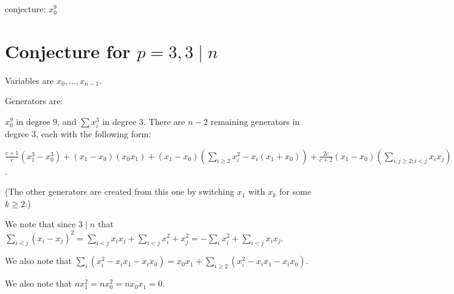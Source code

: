 \documentclass{article}
\numberwithin{equation}{section}
\begin{document}
conjecture: $x_0^9$



\section{Conjecture for $p=3, 3 \mid n$}

Variables are $x_0,\dots,x_{n-1}$. 

Generators are:

$x_0^9$ in degree $9$, and $\sum x_i^3$ in degree $3$. There are $n-2$ remaining generators in degree $3$, each with the following form:

$\frac{c+1}{c}(x_1^3-x_0^3) +(x_1-x_0)(x_0x_1)+(x_1-x_0)\left(\sum_{i \ge 2}x_i^2-x_i(x_1+x_0)\right)+\frac{2c}{c+2}(x_1-x_0)\left(\sum_{i,j \ge 2; i < j}x_ix_j\right)$.



(The other generators are created from this one by switching $x_1$ with $x_k$ for some $k \ge 2$.)


We note that since $3 \mid n$ that $\sum_{i < j} (x_i-x_j)^2 = \sum_{i < j} x_ix_j + \sum_{i<j} x_i^2+x_j^2 = -\sum_i x_i^2 + \sum_{i<j} x_ix_j$. 

We also note that $\sum_i (x_i^2-x_ix_1-x_ix_0) = x_0x_1 + \sum_{i \ge 2} (x_i^2-x_ix_1-x_ix_0) $.


We also note that $nx_1^2=nx_0^2=nx_0x_1=0$.
\end{document}
